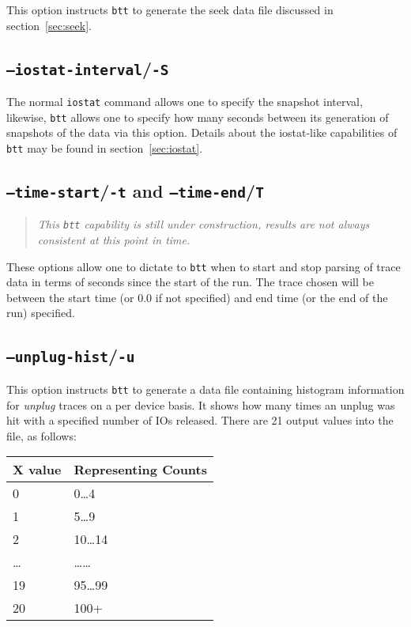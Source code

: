 \documentclass{article}
\begin{document}
  This option instructs \texttt{btt} to generate the seek data file
  discussed in section~\ref{sec:seek}.

\subsection{\label{sec:o-S}\texttt{--iostat-interval}/\texttt{-S}}

  The normal \texttt{iostat} command allows one to specify the snapshot
  interval, likewise, \texttt{btt} allows one to specify how many seconds
  between its generation of snapshots of the data via this option. Details
  about the iostat-like capabilities of \texttt{btt} may be found in
  section~\ref{sec:iostat}.

\subsection{\label{sec:o-tT}\texttt{--time-start}/\texttt{-t} and
\texttt{--time-end}/\texttt{T}}

  \begin{quote}
    \emph{This \texttt{btt} capability is still under construction, results are
    not always consistent at this point in time.}
  \end{quote}

  These options allow one to dictate to \texttt{btt} when to start and stop
  parsing of trace data in terms of seconds since the start of the run. The
  trace chosen will be between the start time (or 0.0 if not
  specified) and end time (or the end of the run) specified.

\subsection{\label{sec:o-u}\texttt{--unplug-hist}/\texttt{-u}}

  This option instructs \texttt{btt} to generate a data file containing
  histogram information for \emph{unplug} traces on a per device
  basis. It shows how many times an unplug was hit with a specified
  number of IOs released. There are 21 output values into the file, as
  follows:

  \medskip
  \begin{tabular}{ll}
\textbf{X value} & \textbf{Representing Counts} \\\hline
0 & 0\dots\/4 \\
1 & 5\dots\/9 \\
2 & 10\dots\/14 \\
\dots & \dots\dots\\
19 & 95\dots\/99 \\
20 & 100+ \\
  \end{tabular}
\end{document}
